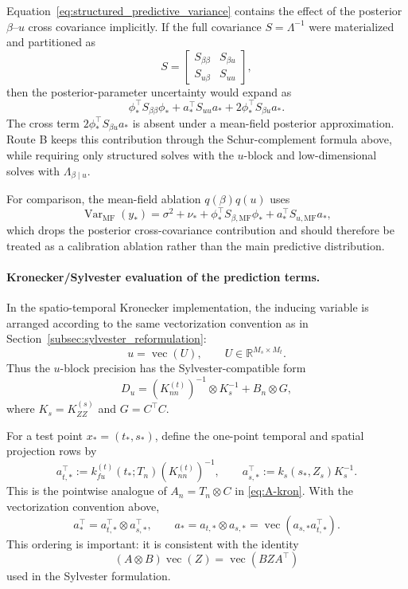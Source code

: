 \documentclass[12pt]{article}
\newcommand{\Var}{\operatorname{Var}}
\newcommand{\vecop}{\operatorname{vec}}
\begin{document}
Equation~\eqref{eq:structured_predictive_variance} contains the effect of the
posterior \(\beta\)--\(u\) cross covariance implicitly.  If the full covariance
\(S=\Lambda^{-1}\) were materialized and partitioned as
\[
    S=
    \begin{bmatrix}
        S_{\beta\beta} & S_{\beta u}\\
        S_{u\beta} & S_{uu}
    \end{bmatrix},
\]
then the posterior-parameter uncertainty would expand as
\begin{equation}
    \phi_*^\top S_{\beta\beta}\phi_*
    +a_*^\top S_{uu}a_*
    +2\phi_*^\top S_{\beta u}a_* .
    \label{eq:full_covariance_predictive_expansion}
\end{equation}
The cross term \(2\phi_*^\top S_{\beta u}a_*\) is absent under a mean-field
posterior approximation.  Route B keeps this contribution through the
Schur-complement formula above, while requiring only structured solves with the
\(u\)-block and low-dimensional solves with \(\Lambda_{\beta\mid u}\).

For comparison, the mean-field ablation \(q(\beta)q(u)\) uses
\begin{equation}
    \Var_{\mathrm{MF}}(y_*)
    =
    \sigma^2+
    \nu_*+
    \phi_*^\top S_{\beta,\mathrm{MF}}\phi_*
    +
    a_*^\top S_{u,\mathrm{MF}}a_* ,
    \label{eq:mean_field_predictive_variance}
\end{equation}
which drops the posterior cross-covariance contribution and should therefore be
treated as a calibration ablation rather than the main predictive distribution.

\paragraph{Kronecker/Sylvester evaluation of the prediction terms.}
In the spatio-temporal Kronecker implementation, the inducing variable is
arranged according to the same vectorization convention as in
Section~\ref{subsec:sylvester_reformulation}:
\[
    u=\vecop(U),
    \qquad
    U\in\mathbb{R}^{M_s\times M_t}.
\]
Thus the \(u\)-block precision has the Sylvester-compatible form
\[
    D_u
    =
    (K_{nn}^{(t)})^{-1}\otimes K_s^{-1}
    +
    B_n\otimes G,
\]
where \(K_s=K_{ZZ}^{(s)}\) and \(G=C^\top C\).

For a test point \(x_*=(t_*,s_*)\), define the one-point temporal and spatial
projection rows by
\begin{equation}
    a_{t,*}^{\top}
    :=
    k_{fu}^{(t)}(t_*;T_n)\left(K_{nn}^{(t)}\right)^{-1},
    \qquad
    a_{s,*}^{\top}
    :=
    k_s(s_*,Z_s)K_s^{-1}.
\end{equation}
This is the pointwise analogue of \(A_n=T_n\otimes C\) in
\eqref{eq:A-kron}.  With the vectorization convention above,
\begin{equation}
    a_*^\top
    =
    a_{t,*}^{\top}\otimes a_{s,*}^{\top},
    \qquad
    a_*
    =
    a_{t,*}\otimes a_{s,*}
    =
    \vecop\!\left(a_{s,*}a_{t,*}^{\top}\right).
    \label{eq:prediction_projection_kron}
\end{equation}
This ordering is important: it is consistent with the identity
\[
    (A\otimes B)\vecop(Z)=\vecop(BZA^\top)
\]
used in the Sylvester formulation.
\end{document}
